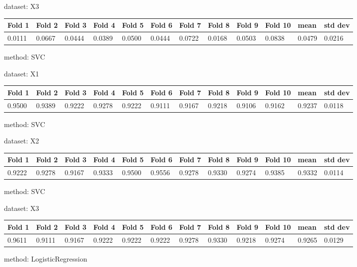 \documentclass{article}
\begin{document}
\noindent dataset: X3

\begin{center}
	\begin{tabular}  { | l | l | l | l | l | l | l | l | l | l | l | l | }
	\hline
	Fold 1 & Fold 2 & Fold 3 & Fold 4 & Fold 5 & Fold 6 & Fold 7 & Fold 8 & Fold 9 & Fold 10 & mean & std dev\\ \hline
	0.0111 & 0.0667 & 0.0444 & 0.0389 & 0.0500 & 0.0444 & 0.0722 & 0.0168 & 0.0503 & 0.0838 & 0.0479 & 0.0216\\
	\hline
	\end{tabular}
\end{center}
\noindent method: SVC

\noindent dataset: X1

\begin{center}
	\begin{tabular}  { | l | l | l | l | l | l | l | l | l | l | l | l | }
	\hline
	Fold 1 & Fold 2 & Fold 3 & Fold 4 & Fold 5 & Fold 6 & Fold 7 & Fold 8 & Fold 9 & Fold 10 & mean & std dev\\ \hline
	0.9500 & 0.9389 & 0.9222 & 0.9278 & 0.9222 & 0.9111 & 0.9167 & 0.9218 & 0.9106 & 0.9162 & 0.9237 & 0.0118\\
	\hline
	\end{tabular}
\end{center}
\noindent method: SVC

\noindent dataset: X2

\begin{center}
	\begin{tabular}  { | l | l | l | l | l | l | l | l | l | l | l | l | }
	\hline
	Fold 1 & Fold 2 & Fold 3 & Fold 4 & Fold 5 & Fold 6 & Fold 7 & Fold 8 & Fold 9 & Fold 10 & mean & std dev\\ \hline
	0.9222 & 0.9278 & 0.9167 & 0.9333 & 0.9500 & 0.9556 & 0.9278 & 0.9330 & 0.9274 & 0.9385 & 0.9332 & 0.0114\\
	\hline
	\end{tabular}
\end{center}
\noindent method: SVC

\noindent dataset: X3

\begin{center}
	\begin{tabular}  { | l | l | l | l | l | l | l | l | l | l | l | l | }
	\hline
	Fold 1 & Fold 2 & Fold 3 & Fold 4 & Fold 5 & Fold 6 & Fold 7 & Fold 8 & Fold 9 & Fold 10 & mean & std dev\\ \hline
	0.9611 & 0.9111 & 0.9167 & 0.9222 & 0.9222 & 0.9222 & 0.9278 & 0.9330 & 0.9218 & 0.9274 & 0.9265 & 0.0129\\
	\hline
	\end{tabular}
\end{center}
\noindent method: LogisticRegression
\end{document}
